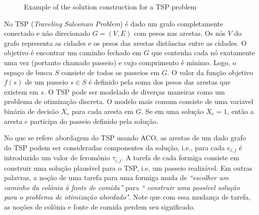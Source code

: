 \begin{figure}[ht]
  \label{img:exemp_aco}
  \caption{Example of the solution construction for a TSP problem}
\end{figure}

No TSP (\textit{Traveling Salesman Problem}) é dado um grafo completamente conectado e
não direcionado $G = (V , E)$ com pesos nas arestas.
Os nós $V$ do grafo representa as cidades e os pesos das arestas
distâncias entre as cidades. O objetivo é encontrar um caminho fechado em $G$
que contenha cada nó exatamente uma vez (portanto chamado passeio)
e cujo comprimento é mínimo. Logo, o espaço de busca $S$ consiste de todos os
passeios em $G$. O valor da função objetivo $f(s)$ de um passeio $s \in S$ 
é definido pela soma dos pesos das arestas que existem em $s$. O TSP pode ser
modelado de diverças maneiras como um problema de otimização discreta.
O modelo mais comum consiste de uma variavel binária de decisão $X_e$ para
cada aresta em $G$.
Se em uma solução $X_e = 1$, então a aresta $e$ participa do passeio definido pela solução.

No que se refere abordagem do TSP usando ACO, 
as arestas de um dado grafo do TSP podem ser consideradas componentes da solução,
i.e., para cada $e_{i,j}$ é introduzido um valor de feromônio $\tau_{i,j}$. 
A tarefa de cada formiga consiste em construir uma solução plausível para o TSP, i.e,
um passeio realizável. Em outras palavras, a noção de uma tarefa para uma formiga
muda de \textit{“escolher um caminho da colônia à fonte de comida”} para \textit{“
construir uma possível solução para o problema de otimização abordado"}. Note que com essa
mudança de tarefa, as noções de colônia e fonte de comida perdem seu significado.

